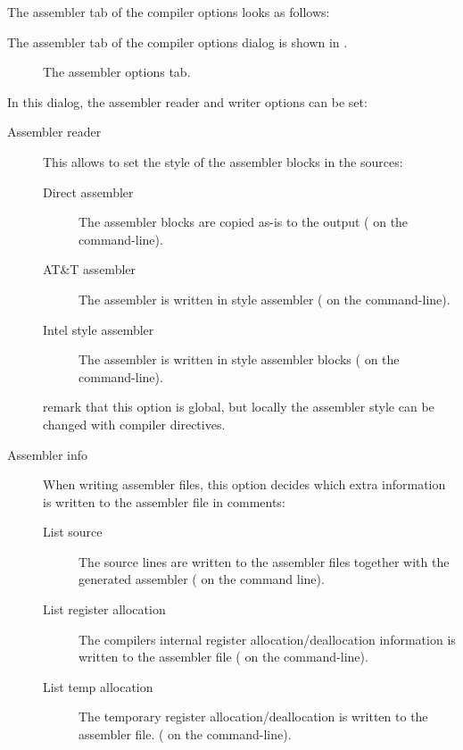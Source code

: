 \begin{htmlonly}
The assembler tab of the compiler options looks as follows:
\end{htmlonly}
\begin{latexonly}
The assembler tab of the compiler options dialog is shown in
.
\begin{figure}[ht]
\begin{center}
\caption{The assembler options tab.}\label{fig:ocompe}
\ifpdf
{}
\else
{}
\fi
\end{center}
\end{figure}
\end{latexonly}
In this dialog, the assembler reader and writer options can be set:
\begin{description}
\item[Assembler reader] This allows to set the style of the assembler blocks
in the sources:
\begin{description}
\item[Direct assembler] The assembler blocks are copied as-is to the output 
( on the command-line).
\item[AT\&T assembler] The assembler is written in  style
assembler ( on the command-line).
\item[Intel style assembler] The assembler is written in  style
assembler blocks ( on the command-line).
\end{description}
remark that this option is global, but locally the assembler style can be
changed with compiler directives. 
\item[Assembler info] When writing assembler files, this option decides
which extra information is written to the assembler file in comments:
\begin{description} 
\item[List source] The source lines are written to the assembler files
together with the generated assembler ( on the command line).
\item[List register allocation] The compilers internal register
allocation/deallocation information is written to the assembler file
( on the command-line).
\item[List temp allocation] The temporary register allocation/deallocation
is written to the assembler file. ( on the command-line).
\end{description}

\end{description}
